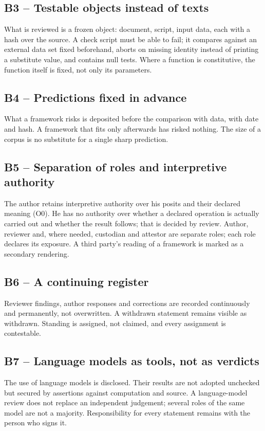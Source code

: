\subsection*{B3 -- Testable objects instead of texts}
What is reviewed is a frozen object: document, script, input data, each with a hash over
the source. A check script must be able to fail; it compares against an external data set
fixed beforehand, aborts on missing identity instead of printing a substitute value, and
contains null tests. Where a function is constitutive, the function itself is fixed, not
only its parameters.

\subsection*{B4 -- Predictions fixed in advance}
What a framework risks is deposited before the comparison with data, with date and hash.
A framework that fits only afterwards has risked nothing. The size of a corpus is no
substitute for a single sharp prediction.

\subsection*{B5 -- Separation of roles and interpretive authority}
The author retains interpretive authority over his posits and their declared meaning (O0).
He has no authority over whether a declared operation is actually carried out and whether
the result follows; that is decided by review. Author, reviewer and, where needed,
custodian and attestor are separate roles; each role declares its exposure. A third
party's reading of a framework is marked as a secondary rendering.

\subsection*{B6 -- A continuing register}
Reviewer findings, author responses and corrections are recorded continuously and
permanently, not overwritten. A withdrawn statement remains visible as withdrawn.
Standing is assigned, not claimed, and every assignment is contestable.

\subsection*{B7 -- Language models as tools, not as verdicts}
The use of language models is disclosed. Their results are not adopted unchecked but
secured by assertions against computation and source. A language-model review does not
replace an independent judgement; several roles of the same model are not a majority.
Responsibility for every statement remains with the person who signs it.

